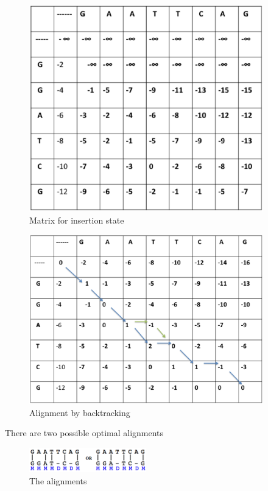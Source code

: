 \documentclass[english, a4paper,11pt]{article}
\begin{document}
%
\begin{figure}
\begin{centering}
\caption{Matrix for insertion state}
\includegraphics[width=4in]{Slide3}
\par\end{centering}

%
\end{figure}


%
\begin{figure}
\begin{centering}
\includegraphics[width=4in]{Slide4}\caption{Alignment by backtracking}

\par\end{centering}

%
\end{figure}


There are two possible optimal alignments

%
\begin{figure}
\begin{centering}
\includegraphics[width=2in]{alignment2}
\par\end{centering}

\caption{The alignments}


%
\end{figure}
\end{document}

